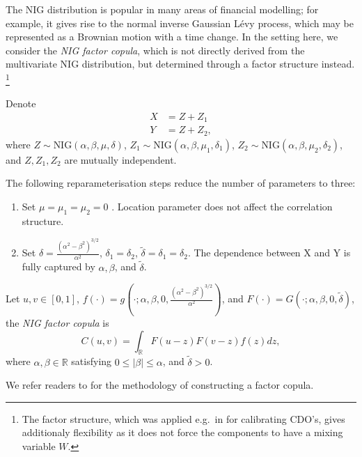 The NIG distribution is popular in many areas of
financial modelling; for example, it gives rise 
to the normal inverse Gaussian L\'evy process, which may be represented
as a Brownian motion with a time change.
In the setting here, we consider the {\em NIG factor copula}, which is
not directly derived from the multivariate NIG distribution, but
determined through a factor structure instead. \footnote{The factor structure,
which was applied e.g.\ in \citep{Kalemanova2007} for calibrating CDO's,
gives additionaly flexibility as it does not force the components to
have a mixing variable $W$.}

Denote 
\begin{align*}
  X &= Z + Z_1 \\ 
  Y &= Z + Z_2,
  \end{align*}
where $Z \sim \text{NIG}(\alpha, \beta, \mu, \delta)$, $Z_1 \sim \text{NIG}(\alpha, \beta, \mu_1, \delta_1)$, 
$Z_2 \sim \text{NIG}(\alpha, \beta, \mu_2, \delta_2)$, and $Z, Z_1, Z_2$ are mutually independent. 

The following reparameterisation steps reduce the number of parameters to three:
\begin{enumerate}
  \item Set $\mu = \mu_1= \mu_2 = 0$ . Location parameter does not affect the correlation structure.
  \item Set $\delta = \frac{(\alpha^2-\beta^2)^{3/2}}{\alpha^2}$, $\delta_1 = \delta_2$, $\tilde \delta = \delta_1 = \delta_2$. 
  The dependence between X and Y is fully captured by $\alpha, \beta$, and $\tilde \delta$.  
\end{enumerate}

\begin{prop}
  Let $u,v \in [0,1]$, $f(\cdot) = g\left(\cdot; \alpha, \beta, 0, \frac{(\alpha^2-\beta^2)^{3/2}}{\alpha^2}
  \right)$, and $F (\cdot) = G(\cdot; \alpha, \beta, 0, \tilde \delta)$, 
  the {\em NIG factor copula} is 
  \begin{equation*}
    C(u,v) = \int_\mathbb{R} F(u-z)F(v-z)f(z)dz,
  \end{equation*}
  where $\alpha, \beta \in \mathbb{R}$ satisfying $0 \leq |\beta| \leq \alpha$, and $\tilde \delta >0 $.
\end{prop}

We refer readers to \cite{krupskii2013factor} for the methodology of constructing a factor copula. 

